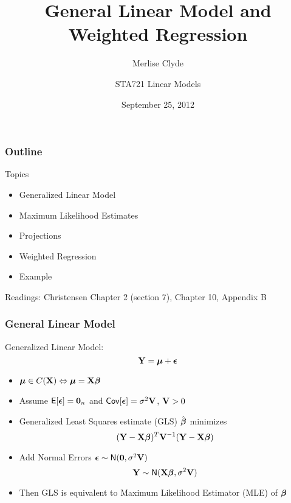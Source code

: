 \documentclass[]{beamer}
\title{General Linear Model and Weighted Regression}
\subtitle{Merlise Clyde}
\author{STA721 Linear Models}
\institute{Duke University}
\date{September 25, 2012}
\begin{document}
\maketitle

\begin{frame}\frametitle{Outline}
Topics
  \begin{itemize}
  \item Generalized Linear Model
  \item Maximum Likelihood Estimates
  \item Projections
  \item Weighted Regression
  \item Example

  \end{itemize}


Readings: Christensen Chapter 2 (section 7),  Chapter 10, Appendix B
\end{frame}
\begin{frame} \frametitle{General Linear Model}
 Generalized Linear Model:
 $$ \mathbf{Y} = \boldsymbol{\mu} + \boldsymbol{\epsilon} $$
  \begin{itemize}
  \item   $\boldsymbol{\mu} \in C(\mathbf{X}) \Leftrightarrow \boldsymbol{\mu} = \mathbf{X} \boldsymbol{\beta}$  \pause
  \item Assume $\textsf{E}[\boldsymbol{\epsilon}] = \mathbf{0}_n$ and $\textsf{Cov}[\boldsymbol{\epsilon}] = \sigma^2 \mathbf{V}$,
    $\mathbf{V} > 0$ \pause  
 \item Generalized Least Squares estimate (GLS) $\hat{\boldsymbol{\beta}}$ minimizes
$$ (\mathbf{Y} - \mathbf{X} \boldsymbol{\beta})^T \mathbf{V}^{-1} (\mathbf{Y} - \mathbf{X}\boldsymbol{\beta})$$  \pause
\item Add Normal Errors $\boldsymbol{\epsilon} \sim \textsf{N}(\mathbf{0}, \sigma^2 \mathbf{V})$ 
$$ \mathbf{Y} \sim \textsf{N}(\mathbf{X}\boldsymbol{\beta}, \sigma^2 \mathbf{V})$$
\item Then GLS is equivalent to Maximum
Likelihood Estimator  (MLE) of $\boldsymbol{\beta}$
\end{itemize}
\end{frame}
\end{document}
